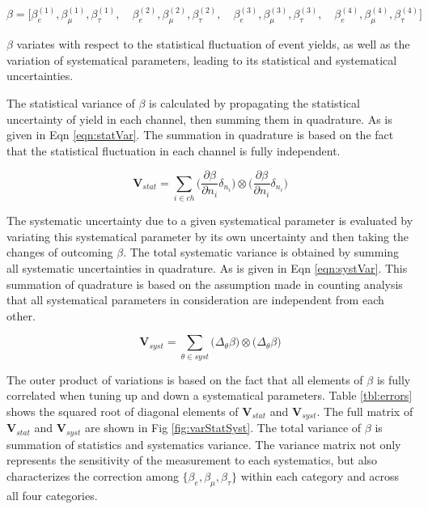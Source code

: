 \begin{equation}
    \beta = \bigg [
    \beta_e^{(1)}, \beta_\mu^{(1)}, \beta_\tau^{(1)}, \quad 
    \beta_e^{(2)}, \beta_\mu^{(2)}, \beta_\tau^{(2)}, \quad 
    \beta_e^{(3)}, \beta_\mu^{(3)}, \beta_\tau^{(3)}, \quad
    \beta_e^{(4)}, \beta_\mu^{(4)}, \beta_\tau^{(4)}
    \bigg ]
\end{equation}

$\beta$ variates with respect to the statistical fluctuation 
of event yields, as well as the variation of systematical parameters,
leading to its statistical and systematical uncertainties.


The statistical variance of $\beta$ is calculated by propagating 
the statistical uncertainty of yield in each channel, 
then summing them in quadrature. As is given in Eqn \ref{eqn:statVar}.
The summation in quadrature is based on the fact that the statistical 
fluctuation in each channel is fully independent.

\begin{equation}
    \textbf{V}_{stat} = \sum_{i \in ch} 
    \bigg( \frac{\partial \beta}{\partial n_i} \delta_{n_i} \bigg) \otimes 
    \bigg( \frac{\partial \beta}{\partial n_i} \delta_{n_i} \bigg)
    \label{eqn:statVar}
\end{equation}

The systematic uncertainty due to a given systematical parameter is
evaluated by variating this systematical parameter by its 
own uncertainty and then taking the changes of outcoming $\beta$. 
The total systematic variance is obtained by summing all systematic 
uncertainties in quadrature. As is given in Eqn \ref{eqn:systVar}.
This summation of quadrature is based on the assumption made in counting analysis 
that all systematical parameters in consideration are independent from each other.


\begin{equation}
    \textbf{V}_{syst} = \sum_{\theta \in syst}
    \big( \Delta_{\theta}\beta \big) \otimes 
    \big( \Delta_{\theta}\beta \big)
    \label{eqn:systVar}
\end{equation}

The outer product of variations is based on the fact that all elements of
$\beta$ is fully correlated when tuning up and down a systematical parameters.
Table \ref{tbl:errors} shows the squared root of diagonal elements of 
$\textbf{V}_{stat}$ and $\textbf{V}_{syst}$. The full matrix of $\textbf{V}_{stat}$ 
and $\textbf{V}_{syst}$ are shown in Fig \ref{fig:varStatSyst}.
The total variance of $\beta$ is summation of statistics and systematics variance.
The variance matrix not only represents the sensitivity of the measurement 
to each systematics, but also characterizes the correction among 
$\{\beta_e, \beta_\mu, \beta_\tau\}$ within each category and across all four categories. 

